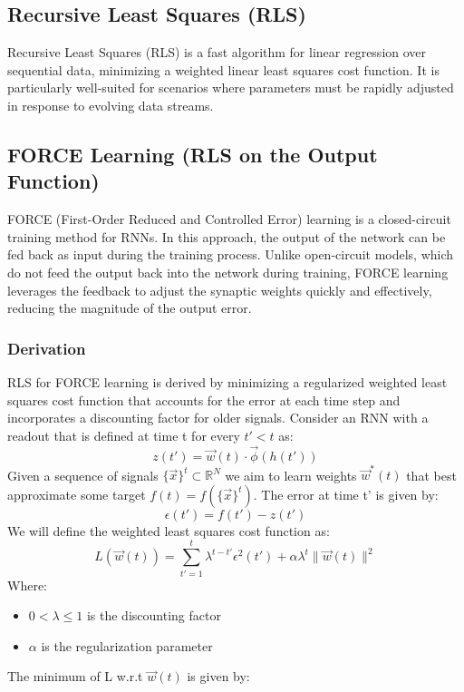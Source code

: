 \documentclass[11pt]{book} %
\begin{document}
\subsection{Recursive Least Squares (RLS)}
Recursive Least Squares (RLS) is a fast algorithm for linear regression over sequential data, 
minimizing a weighted linear least squares cost function. 
It is particularly well-suited for scenarios where parameters must be rapidly adjusted in response to evolving data streams.

\subsection{FORCE Learning (RLS on the Output Function)}
FORCE (First-Order Reduced and Controlled Error) learning is a closed-circuit training method for RNNs. 
In this approach, the output of the network can be fed back as input during the training process. 
Unlike open-circuit models, which do not feed the output back into the network during training,
FORCE learning leverages the feedback to adjust the synaptic weights quickly and effectively, reducing the magnitude of the output error. 

\subsubsection{Derivation}
RLS for FORCE learning is derived by minimizing a regularized weighted least squares cost function that accounts for the error at each time step 
and incorporates a discounting factor for older signals.
Consider an RNN with a readout that is defined at time t for every $t' < t$ as:
\[
    z(t') = \vec{w}(t) \cdot \vec{\phi} (h(t'))
\]
Given a sequence of signals $\{\vec{x}\}^t \subset \mathbb{R}^N$ we aim to learn weights $\vec{w}^*(t)$ that best approximate some target $f(t) = f(\{\vec{x}\}^t)$.
The error at time t' is given by:
\[
    \epsilon(t') = f(t') - z(t')
\]
We will define the weighted least squares cost function as:
\[
    L(\vec{w}(t)) = \sum_{t'=1}^t \lambda^{t-t'} \epsilon^2(t') + \alpha \lambda^t \lVert \vec{w}(t) \rVert^2
\]
Where:
\begin{itemize}
    \item $0 < \lambda \leq 1$ is the discounting factor
    \item $\alpha$ is the regularization parameter
\end{itemize}

The minimum of L w.r.t $\vec{w}(t)$ is given by:
\end{document}
